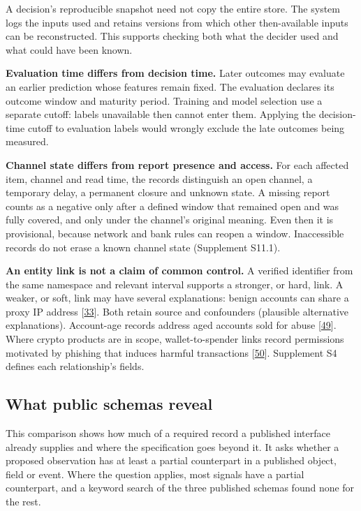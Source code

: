 \documentclass[acmlarge,review,anonymous,nonacm]{acmart}
\begin{document}
A decision's reproducible snapshot need not copy the entire store. The
system logs the inputs used and retains versions from which other
then-available inputs can be reconstructed. This supports checking both
what the decider used and what could have been known.

\textbf{Evaluation time differs from decision time.} Later outcomes may
evaluate an earlier prediction whose features remain fixed. The
evaluation declares its outcome window and maturity period. Training and
model selection use a separate cutoff: labels unavailable then cannot
enter them. Applying the decision-time cutoff to evaluation labels would
wrongly exclude the late outcomes being measured.

\textbf{Channel state differs from report presence and access.} For each
affected item, channel and read time, the records distinguish an open
channel, a temporary delay, a permanent closure and unknown state. A
missing report counts as a negative only after a defined window that
remained open and was fully covered, and only under the channel's
original meaning. Even then it is provisional, because network and bank
rules can reopen a window. Inaccessible records do not erase a known
channel state (Supplement S11.1).

\textbf{An entity link is not a claim of common control.} A verified
identifier from the same namespace and relevant interval supports a
stronger, or hard, link. A weaker, or soft, link may have several
explanations: benign accounts can share a proxy IP address
{[}\protect\hyperlink{ref-Liu2018GEM}{33}{]}. Both retain source and
confounders (plausible alternative explanations). Account-age records
address aged accounts sold for abuse
{[}\protect\hyperlink{ref-Thomas2013}{49}{]}. Where crypto products are
in scope, wallet-to-spender links record permissions motivated by
phishing that induces harmful transactions
{[}\protect\hyperlink{ref-Chen2025Phishing}{50}{]}. Supplement S4
defines each relationship's fields.

\hypertarget{what-public-schemas-reveal}{%
\subsection{What public schemas
reveal}\label{what-public-schemas-reveal}}

This comparison shows how much of a required record a published
interface already supplies and where the specification goes beyond it.
It asks whether a proposed observation has at least a partial
counterpart in a published object, field or event. Where the question
applies, most signals have a partial counterpart, and a keyword search
of the three published schemas found none for the rest.
\end{document}
